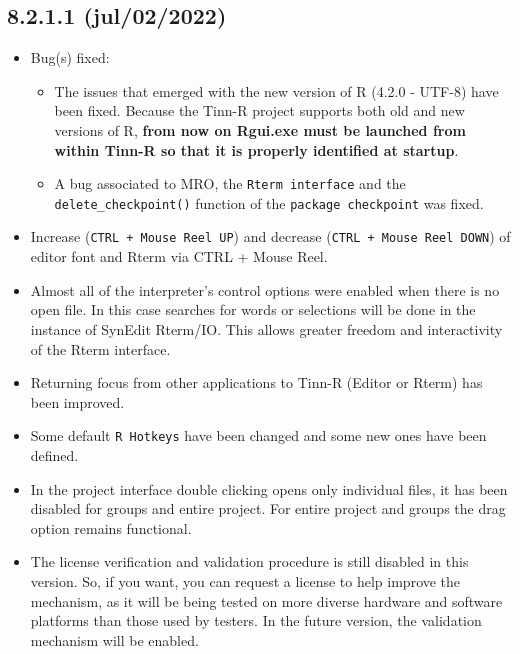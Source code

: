\subsection*{8.2.1.1 (jul/02/2022)}
\begin{itemize}
  \item Bug(s) fixed:
    \begin{itemize}
        \item The issues that emerged with the new version of R (4.2.0 - UTF-8) have been fixed.
          Because the Tinn-R project supports both old and new versions of R, \textbf{from now on Rgui.exe must be launched from within Tinn-R so that it is properly
          identified at startup}.
      \item A bug associated to MRO, the \texttt{Rterm interface} and the \\
        \texttt{delete\_checkpoint()} function of the \texttt{package checkpoint} was fixed.
    \end{itemize}
  \item Increase (\texttt{CTRL + Mouse Reel UP}) and decrease (\texttt{CTRL + Mouse Reel DOWN}) of editor font and Rterm via CTRL + Mouse Reel.
  \item Almost all of the interpreter's control options were enabled when there is no open file. In this case searches for words or selections will be done
    in the instance of SynEdit Rterm/IO. This allows greater freedom and interactivity of the Rterm interface.
  \item Returning focus from other applications to Tinn-R (Editor or Rterm) has been improved.
  \item Some default \texttt{R Hotkeys} have been changed and some new ones have been defined.
  \item In the project interface double clicking opens only individual files, it has been disabled for groups and entire project. For entire project and groups
    the drag option remains functional.
  \item The license verification and validation procedure is still disabled in this version.
    So, if you want, you can request a license to help improve the mechanism,
    as it will be being tested on more diverse hardware and software platforms than
    those used by testers. In the future version, the validation mechanism will be enabled.
\end{itemize}
